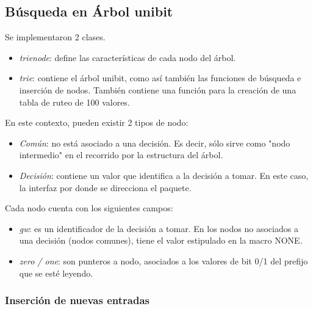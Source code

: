 \subsection {Búsqueda en Árbol unibit}

Se implementaron 2 clases. 

\begin{itemize}
	\item \textit{trienode}: define las características de cada nodo del árbol.
	\item \textit{trie}: contiene el árbol unibit, como así también las funciones de búsqueda e inserción de nodos. También contiene una función para la creación de una tabla de ruteo de 100 valores.
\end{itemize}


En este contexto, pueden existir 2 tipos de nodo:

\begin{itemize}
	\item \textit{Común}: no está asociado a una decisión. Es decir, sólo sirve como "nodo intermedio" en el recorrido por la estructura del árbol.
	\item \textit{Decisión}: contiene un valor que identifica a la decisión a tomar. En este caso, la interfaz por donde se direcciona el paquete.
\end{itemize}

Cada nodo cuenta con los siguientes campos:
\begin{itemize}
	\item \textit{gw}: es un identificador de la decisión a tomar. En los nodos no asociados a una decisión (nodos comunes), tiene el valor estipulado en la macro NONE.
    \item \textit{zero / one}: son punteros a nodo, asociados a los valores de bit 0/1 del prefijo que se esté leyendo.

\end{itemize}

\subsubsection{Inserción de nuevas entradas}

